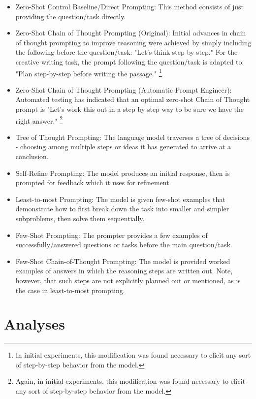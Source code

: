 \documentclass[11pt]{article}
\begin{document}
\begin{itemize}
  \item Zero-Shot Control Baseline/Direct Prompting: This method consists of just providing the question/task directly.
  \item Zero-Shot Chain of Thought Prompting (Original): Initial advances in chain of thought prompting to improve reasoning were achieved by simply including the following before the question/task: "Let's think step by step." \cite{kojima_large_2023} For the creative writing task, the prompt following the question/task is adapted to: "Plan step-by-step before writing the passage." \footnote{In initial experiments, this modification was found necessary to elicit any sort of step-by-step behavior from the model.}
  \item Zero-Shot Chain of Thought Prompting (Automatic Prompt Engineer): Automated testing has indicated that an optimal zero-shot Chain of Thought prompt is "Let's work this out in a step by step way to be sure we have the right answer." \cite{zhou_large_2022} \footnote{Again, in initial experiments, this modification was found necessary to elicit any sort of step-by-step behavior from the model.}
  \item Tree of Thought Prompting: The language model traverses a tree of decisions - choosing among multiple steps or ideas it has generated to arrive at a conclusion. \cite{yao_tree_2023}
  \item Self-Refine Prompting: The model produces an initial response, then is prompted for feedback which it uses for refinement. \cite{madaan_self-refine_2023}
  \item Least-to-most Prompting: The model is given few-shot examples that demonstrate how to first break down the task into smaller and simpler subproblems, then solve them sequentially. \cite{zhou_least--most_2023}
  \item Few-Shot Prompting: The prompter provides a few examples of successfully/answered questions or tasks before the main question/task.
  \item Few-Shot Chain-of-Thought Prompting: The model is provided worked examples of answers in which the reasoning steps are written out. \cite{wei_chain--thought_nodate} Note, however, that such steps are not explicitly planned out or mentioned, as is the case in least-to-most prompting.
\end{itemize}

\section*{Analyses}
\end{document}
